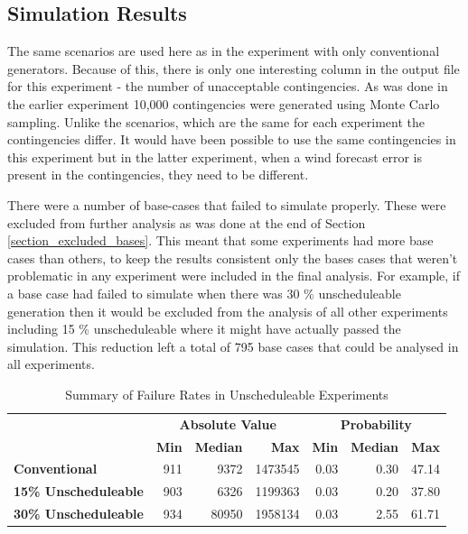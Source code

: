 \documentclass[a4paper,oneside,12pt]{report}
\begin{document}
\subsection{Simulation Results}

The same scenarios are used here as in the experiment with only conventional generators. Because of this, there is only one interesting column in the output file for this experiment - the number of unacceptable contingencies. As was done in the earlier experiment 10,000 contingencies were generated using Monte Carlo sampling. Unlike the scenarios, which are the same for each experiment the contingencies differ. It would have been possible to use the same contingencies in this experiment but in the latter experiment, when a wind forecast error is present in the contingencies, they need to be different.

There were a number of base-cases that failed to simulate properly. These were excluded from further analysis as was done at the end of Section \ref{section_excluded_bases}. This meant that some experiments had more base cases than others, to keep the results consistent only the bases cases that weren't problematic in any experiment were included in the final analysis. For example, if a base case had failed to simulate when there was 30 \% unscheduleable generation then it would be excluded from the analysis of all other experiments including 15 \% unscheduleable where it might have actually passed the simulation. This reduction left a total of 795 base cases that could be analysed in all experiments.

\begin{table}[htbp]
\caption{Summary of Failure Rates in Unscheduleable Experiments}
\begin{tabular}{l|r|r|r|r|r|r}
\bfseries & \multicolumn{3}{c|}{ \bfseries Absolute Value} & \multicolumn{3}{c}{ \bfseries Probability} \\
\bfseries & \bfseries Min & \bfseries Median & \bfseries Max & \bfseries Min & \bfseries Median & \bfseries Max \\
\hline \hline
\bfseries Conventional & 911 & 9372 & 1473545 & 0.03 & 0.30 & 47.14 \\
\bfseries 15\% Unscheduleable & 903 & 6326 & 1199363 & 0.03 & 0.20 & 37.80 \\
\bfseries 30\% Unscheduleable & 934 & 80950 & 1958134 & 0.03 & 2.55 & 61.71 \\
\hline
\end{tabular}
\label{table_pacc_unsch}
\end{table}
\end{document}
